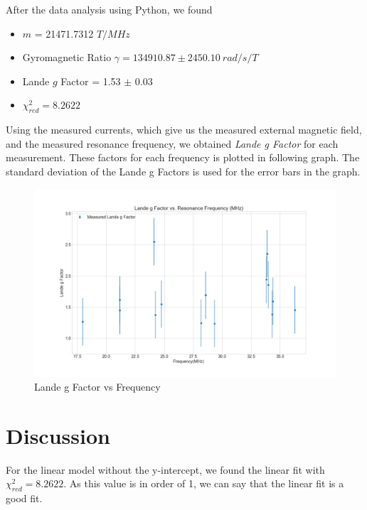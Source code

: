 \documentclass[letterpaper,12pt]{article}
\begin{document}
After the data analysis using Python, we found 
\begin{itemize}
  \item[] $m$ = 21471.7312 $T/MHz$
  \item[] Gyromagnetic Ratio $\gamma = 134910.87 \pm 2450.10\ rad/s/T$
  \item[] Lande $g$ Factor = 1.53 $\pm$ 0.03
  \item[] $\chi_{red}^2 = 8.2622$ 
\end{itemize}

Using the measured currents, which give us the measured external magnetic field, 
and the measured resonance frequency, we obtained \emph{Lande g Factor} for each measurement.
These factors for each frequency is plotted in following graph. The standard deviation
of the Lande g Factors is used for the error bars in the graph.

\begin{figure}[H]
  \centering
  \includegraphics[width=1.0\linewidth]{../code/Pankaj/lab6_g_factor_vs_freq.png}    
  \begin{center}
    \begin{center}   
    \end{center}  \end{center}
  \caption{Lande g Factor vs Frequency}
  \label{lande-vs-frq}
\end{figure}

\section{Discussion}

For the linear model without the y-intercept, we found the linear fit with $\chi_{red}^2 = 8.2622$. As this value 
is in order of 1, we can say that the linear fit is a good fit. 
\end{document}
